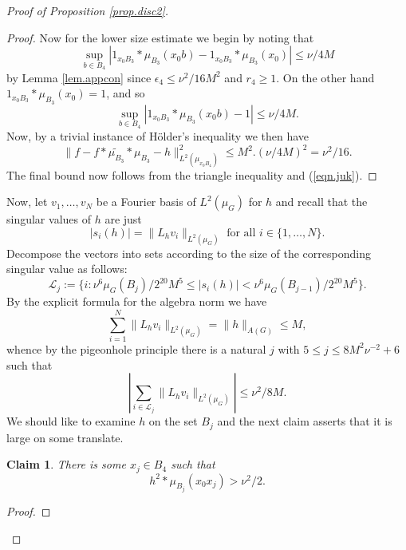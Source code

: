 \documentclass[12pt]{amsart}
\numberwithin{equation}{section}
\theoremstyle{plain}
\newtheorem*{claim}{Claim}
\theoremstyle{definition}
\renewcommand{\leq}{\leqslant}
\renewcommand{\geq}{\geqslant}
\begin{document}
\begin{proof}[Proof of Proposition \ref{prop.disc2}]
\begin{proof}
Now for the lower size estimate we begin by noting that
\begin{equation*}
\sup_{b \in B_4}|1_{x_0B_3} \ast \mu_{B_3}(x_0b) - 1_{x_0B_3} \ast \mu_{B_3}(x_0) | \leq \nu/4M
\end{equation*}
by Lemma \ref{lem.appcon} since $\epsilon_4 \leq \nu^2/16M^2$ and $r_4 \geq 1$.  On the other hand $1_{x_0B_3} \ast \mu_{B_3}(x_0)=1$, and so 
\begin{equation*}
\sup_{b \in B_4}|1_{x_0B_3} \ast \mu_{B_3}(x_0b) - 1| \leq \nu/4M.
\end{equation*}
Now, by a trivial instance of H{\"o}lder's inequality we then have
\begin{equation*}
\|f -f \ast \widetilde{\mu_{B_3}} \ast \mu_{B_3}-h\|_{L^2(\mu_{x_0B_4})}^2\leq M^2. (\nu/4M)^2 = \nu^2/16.
\end{equation*}
The final bound now follows from the triangle inequality and (\ref{eqn.juk}).
\end{proof}
Now, let $v_1,\dots,v_N$ be a Fourier basis of $L^2(\mu_G)$ for $h$ and recall that the singular values of $h$ are just
\begin{equation*}
|s_i(h)| = \|L_hv_i\|_{L^2(\mu_G)} \textrm{ for all } i \in \{1,\dots,N\}.
\end{equation*}
Decompose the vectors into sets according to the size of the corresponding singular value as follows:
\begin{equation*}
\mathcal{L}_j:=\{i:  \nu^6\mu_G(B_{j})/2^{20}M^5\leq |s_i(h)| < \nu^6\mu_G(B_{j-1})/2^{20}M^5\}.
\end{equation*}
By the explicit formula for the algebra norm we have
\begin{equation*}
\sum_{i=1}^N{\|L_hv_i\|_{L^2(\mu_G)}} = \|h\|_{A(G)} \leq M,
\end{equation*}
whence by the pigeonhole principle there is a natural $j$ with $ 5 \leq j \leq 8M^2\nu^{-2}+6$ such that
\begin{equation*}
 |\sum_{i \in \mathcal{L}_j}{\| L_hv_i\|_{L^2(\mu_G)}}| \leq \nu^2/8M.
\end{equation*}
We should like to examine $h$ on the set $B_j$ and the next claim asserts that it is large on some translate.
\begin{claim}
There is some $x_j \in B_4$ such that
\begin{equation*}
h^2\ast \mu_{B_j}(x_0x_j)> \nu^2/2.
\end{equation*}
\end{claim}
\begin{proof}

\end{proof}
\end{proof}
\end{document}
